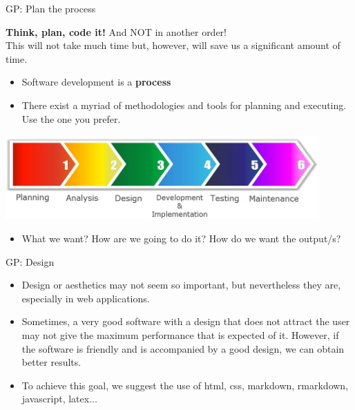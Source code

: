 \documentclass[ignorenonframetext,]{beamer}
\providecommand{\tightlist}{%
  \setlength{\itemsep}{0pt}\setlength{\parskip}{0pt}}
\begin{document}
\begin{frame}{%
\protect\hypertarget{gp-plan-the-process}{%
GP: Plan the process}}

\textbf{Think, plan, code it!} And NOT in another order!\\ 
This will not take much time but, however, will save us a significant
amount of time.

\begin{itemize}
\tightlist
\item
  Software development is a \textbf{process}
\item
  There exist a myriad of methodologies and tools for planning and
  executing. Use the one you prefer.
\end{itemize}

\begin{center}
\includegraphics[width=0.9\textwidth]{"images/softwareDevelopmentProcess"}
\end{center}

\begin{itemize}
	\tightlist
	\item
	What we want? How are we going to do it? How do we want the output/s?
\end{itemize}

\end{frame}

\begin{frame}{%
		\protect\hypertarget{gp-design}{%
			GP: Design}}
	\begin{itemize}
		\item
		Design or aesthetics may not seem so important, but nevertheless they are,
		especially in web applications.
		\item
		Sometimes, a very good software with a design that does not attract the
		user may not give the maximum performance that is expected of it.
		However, if the software is friendly and is accompanied by a good design,
		we can obtain better results.
		\item
		To achieve this goal, we suggest the use of html, css, markdown,
		rmarkdown, javascript, latex...
    \end{itemize}
    
\end{frame}
\end{document}

